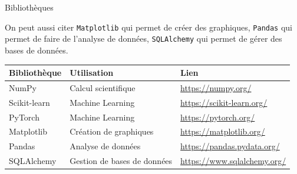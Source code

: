 \begin{section}{Bibliothèques}
\begin{solution}
	On peut aussi citer \lstinline{Matplotlib} qui permet de créer des graphiques, \texttt{Pandas} qui permet de faire de l'analyse de données, \lstinline{SQLAlchemy} qui permet de gérer des bases de données.\newline \\
    \begin{tabular}{lll}
        \textbf{Bibliothèque} & \textbf{Utilisation} & \textbf{Lien} \\ \hline
        NumPy & Calcul scientifique & \url{https://numpy.org/} \\
        Scikit-learn & Machine Learning & \url{https://scikit-learn.org/} \\
        PyTorch & Machine Learning & \url{https://pytorch.org/} \\
        Matplotlib & Création de graphiques & \url{https://matplotlib.org/} \\
        Pandas & Analyse de données & \url{https://pandas.pydata.org/} \\
        SQLAlchemy & Gestion de bases de données & \url{https://www.sqlalchemy.org/} \\
    \end{tabular}

\end{solution} 
\end{section}

